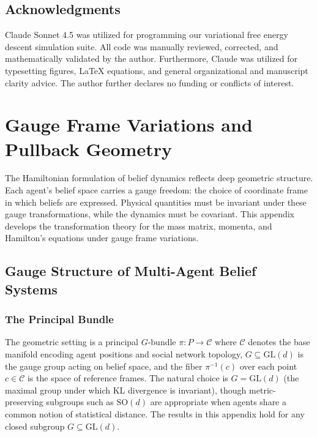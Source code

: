 \documentclass[12pt]{article}
\begin{document}
\subsection*{Acknowledgments}
Claude Sonnet 4.5 was utilized for programming our variational free energy descent simulation suite.  All code was manually reviewed, corrected, and mathematically validated by the author.  Furthermore, Claude was utilized for typesetting figures, LaTeX equations, and general organizational and manuscript clarity advice. The author further declares no funding or conflicts of interest.

\appendix


\section{Gauge Frame Variations and Pullback Geometry}
\label{app:gauge}

The Hamiltonian formulation of belief dynamics reflects deep geometric structure. Each agent's belief space carries a gauge freedom: the choice of coordinate frame in which beliefs are expressed. Physical quantities must be invariant under these gauge transformations, while the dynamics must be covariant. This appendix develops the transformation theory for the mass matrix, momenta, and Hamilton's equations under gauge frame variations.

\subsection{Gauge Structure of Multi-Agent Belief Systems}

\subsubsection{The Principal Bundle}

The geometric setting is a principal $G$-bundle $\pi: P \to \mathcal{C}$ where $\mathcal{C}$ denotes the base manifold encoding agent positions and social network topology, $G \subseteq \mathrm{GL}(d)$ is the gauge group acting on belief space, and the fiber $\pi^{-1}(c)$ over each point $c \in \mathcal{C}$ is the space of reference frames. The natural choice is $G = \mathrm{GL}(d)$ (the maximal group under which KL divergence is invariant), though metric-preserving subgroups such as $\mathrm{SO}(d)$ are appropriate when agents share a common notion of statistical distance. The results in this appendix hold for any closed subgroup $G \subseteq \mathrm{GL}(d)$.
\end{document}
